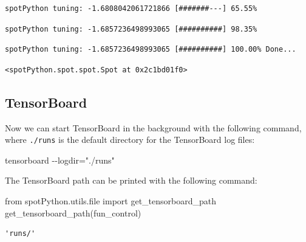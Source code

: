 \documentclass[
  letterpaper,
  DIV=11,
  numbers=noendperiod]{scrreprt}
\newenvironment{Shaded}{\begin{snugshade}}{\end{snugshade}}
\newcommand{\BuiltInTok}[1]{\textcolor[rgb]{0.00,0.23,0.31}{#1}}
\newcommand{\ImportTok}[1]{\textcolor[rgb]{0.00,0.46,0.62}{#1}}
\newcommand{\NormalTok}[1]{\textcolor[rgb]{0.00,0.23,0.31}{#1}}
\begin{document}
\begin{verbatim}
spotPython tuning: -1.6808042061721866 [#######---] 65.55% 
\end{verbatim}

\begin{verbatim}
spotPython tuning: -1.6857236498993065 [##########] 98.35% 
\end{verbatim}

\begin{verbatim}
spotPython tuning: -1.6857236498993065 [##########] 100.00% Done...
\end{verbatim}

\begin{verbatim}
<spotPython.spot.spot.Spot at 0x2c1bd01f0>
\end{verbatim}

\hypertarget{sec-tensorboard-10}{%
\subsection{TensorBoard}\label{sec-tensorboard-10}}

Now we can start TensorBoard in the background with the following
command, where \texttt{./runs} is the default directory for the
TensorBoard log files:

\begin{Shaded}
\begin{Highlighting}[]
\NormalTok{tensorboard {-}{-}logdir="./runs"}
\end{Highlighting}
\end{Shaded}

\begin{tcolorbox}[enhanced jigsaw, rightrule=.15mm, opacityback=0, colframe=quarto-callout-tip-color-frame, opacitybacktitle=0.6, toptitle=1mm, arc=.35mm, colbacktitle=quarto-callout-tip-color!10!white, coltitle=black, toprule=.15mm, leftrule=.75mm, titlerule=0mm, title=\textcolor{quarto-callout-tip-color}{\faLightbulb}\hspace{0.5em}{Tip: TENSORBOARD\_PATH}, bottomrule=.15mm, breakable, bottomtitle=1mm, left=2mm, colback=white]

The TensorBoard path can be printed with the following command:

\begin{Shaded}
\begin{Highlighting}[]
\ImportTok{from}\NormalTok{ spotPython.utils.}\BuiltInTok{file} \ImportTok{import}\NormalTok{ get\_tensorboard\_path}
\NormalTok{get\_tensorboard\_path(fun\_control)}
\end{Highlighting}
\end{Shaded}

\begin{verbatim}
'runs/'
\end{verbatim}

\end{tcolorbox}
\end{document}
